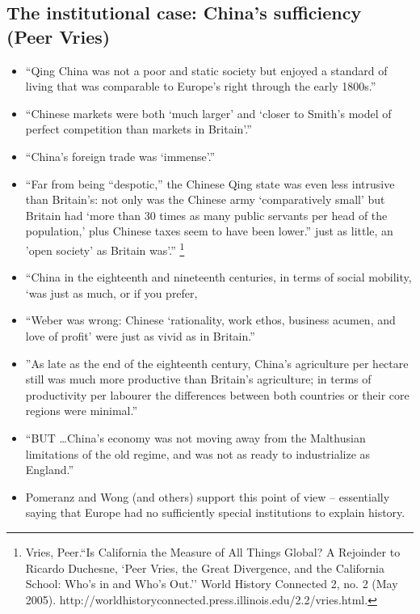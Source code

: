 \documentclass[final]{beamer}
\begin{document}
\subsection{The institutional case: China's sufficiency (Peer Vries)}
\begin{frame}

              \begin{itemize}

              	\item``Qing China was not a poor and static society but enjoyed a standard of living that was comparable to Europe's right through the early 1800s.''
				\item ``Chinese markets were both `much larger' and `closer to Smith's model of perfect competition than markets in Britain'.''
				\item ``China's foreign trade was `immense'.''
				\item ``Far from being ``despotic,'' the Chinese Qing state was even less intrusive than Britain's: not only was the Chinese army `comparatively small' but Britain had `more than 30 times as many public servants per head of the population,' plus Chinese taxes seem to have been lower.''
 just as little, an 'open society' as Britain was'.''
				               \footnote{Vries, Peer.``Is California the Measure of All Things Global? A Rejoinder to Ricardo Duchesne, `Peer Vries, the Great Divergence, and the California School: Who's in and Who's Out.'' World History Connected 2, no. 2 (May 2005). http://worldhistoryconnected.press.illinois.edu/2.2/vries.html.}

				\end{itemize}
\end{frame}

\begin{frame}
              \begin{itemize}				
				\item ``China in the eighteenth and nineteenth centuries, in terms of social mobility, `was just as much, or if you prefer,
				\item ``Weber was wrong: Chinese `rationality, work ethos, business acumen, and love of profit' were just as vivid as in Britain.''
				\item ''As late as the end of the eighteenth century, China's agriculture per hectare still was much more productive than Britain's agriculture; in terms of productivity per labourer the differences between both countries or their core regions were minimal.''
				\item ``BUT \ldots China's economy was not moving away from the Malthusian limitations of the old regime, and was not as ready to industrialize as England.''
				\item Pomeranz and Wong (and others) support this point of view -- essentially saying that Europe had no sufficiently special institutions to explain history.
				
				\end{itemize}
\end{frame}		
\end{document}
